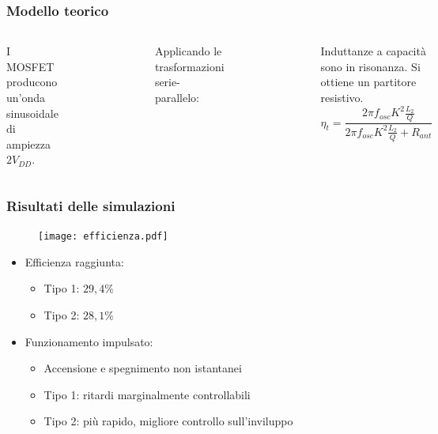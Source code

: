 \documentclass{beamer}
\begin{document}
\begin{frame}
\frametitle{Modello teorico}
\begin{columns}
	I MOSFET producono un'onda sinusoidale di ampiezza $2V_{DD}$.
	\begin{figure}
	\includegraphics[width=\textwidth]{images/cir_model.pdf}
	\end{figure}
	Applicando le trasformazioni serie-parallelo:
	\begin{figure}
	\includegraphics[width=\textwidth]{images/cir_model3.pdf}
	\end{figure}

	Induttanze a capacit\`a sono in risonanza. Si ottiene un partitore
	resistivo.
	\medskip
	$$ \eta_t = \frac{2\pi f_{osc} K^2 \frac{L_2}{Q}}{2\pi f_{osc} K^2
	\frac{L_2}{Q} + R_{ant}} $$
	\medskip
	\center{}
\end{columns}
\end{frame}
%
\begin{frame}
\frametitle{Risultati delle simulazioni}
\begin{figure}
\texttt{[image: efficienza.pdf]}
\end{figure}
\end{frame}
\begin{frame}
\begin{itemize}
	\vfill
	\item Efficienza raggiunta:
	\begin{itemize}
		\item Tipo 1: $29,4\%$
		\item Tipo 2: $28,1\%$
	\end{itemize}
	\vfill
	\item Funzionamento impulsato:
	\begin{itemize}
		\item Accensione e spegnimento non istantanei 
		\item Tipo 1: ritardi marginalmente controllabili
		\item Tipo 2: più rapido, migliore controllo sull'inviluppo
	\end{itemize}
	\vfill
\end{itemize}
\end{frame}
\end{document}
